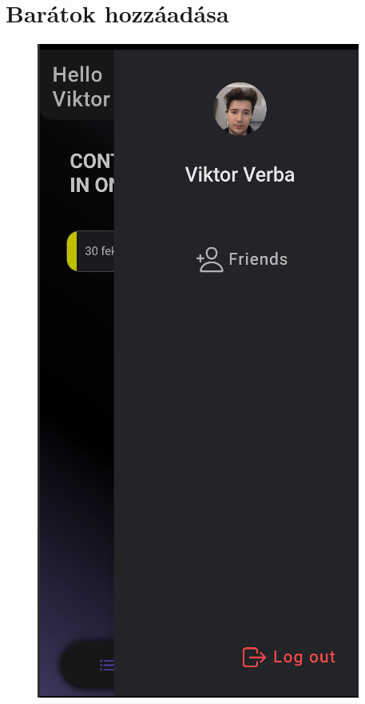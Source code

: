 \documentclass[12pt]{report}
\begin{document}
\section{Barátok hozzáadása}
\begin{figure}[H]
    \centering

    \begin{minipage}[b]{0.25\textwidth}
        \centering
        \includegraphics[width=\linewidth]{src/friends1.png}


\end{minipage}
\end{figure}
\end{document}
